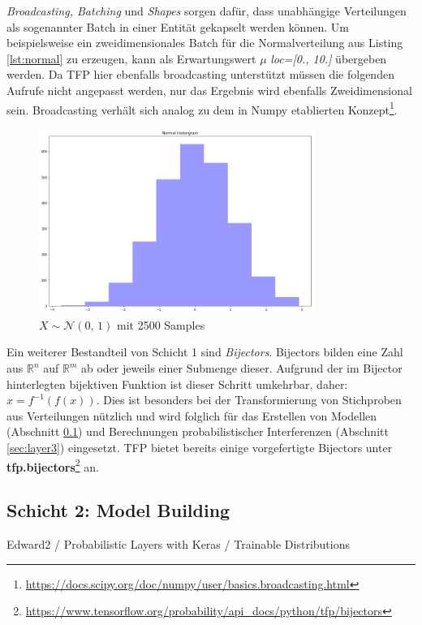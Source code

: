 \documentclass[12pt]{article}
\begin{document}
\textit{Broadcasting, Batching} und \textit{Shapes} sorgen dafür, dass unabhängige Verteilungen als sogenannter Batch in einer Entität  gekapselt werden können. Um beispielsweise ein zweidimensionales Batch für die Normalverteilung aus Listing \ref{lst:normal} zu erzeugen, kann als Erwartungswert $\mu$ \textit{loc=[0., 10.]} übergeben werden. Da TFP hier ebenfalls broadcasting unterstützt müssen die folgenden Aufrufe nicht angepasst werden, nur das Ergebnis wird ebenfalls Zweidimensional sein. Broadcasting verhält sich analog zu dem in Numpy etablierten Konzept\footnote{\url{https://docs.scipy.org/doc/numpy/user/basics.broadcasting.html}}.

\begin{figure}[h]
    \centering
    \includegraphics[width=0.8\textwidth]{./figs/normal-dist.png}
    \caption{$X \sim \mathcal{N}(0,\, 1)$ mit 2500 Samples}
    \label{fig:normal_dist}
\end{figure}

Ein weiterer Bestandteil von Schicht 1 sind \textit{Bijectors}. Bijectors bilden eine Zahl aus $\mathbb{R}^n$ auf $\mathbb{R}^m$ ab oder jeweils einer Submenge dieser. Aufgrund der im Bijector hinterlegten bijektiven Funktion ist dieser Schritt umkehrbar, daher: $x = f^{-1}(f(x))$. Dies ist besonders bei der Transformierung von Stichproben aus Verteilungen nützlich und wird folglich für das Erstellen von Modellen (Abschnitt \ref{sec:layer2}) und Berechnungen probabilistischer Interferenzen (Abschnitt \ref{sec:layer3}) eingesetzt. TFP bietet bereits einige vorgefertigte Bijectors unter \textbf{tfp.bijectors}\footnote{\url{https://www.tensorflow.org/probability/api_docs/python/tfp/bijectors}} an. 


\subsection{Schicht 2: Model Building}
\label{sec:layer2}
Edward2 / Probabilistic Layers with Keras / Trainable Distributions
\end{document}
